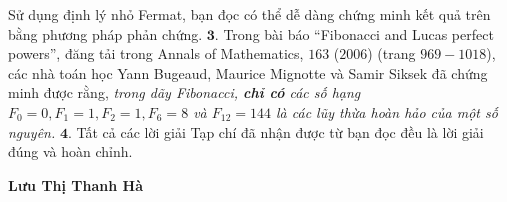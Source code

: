 \begin{multicols}{2}
	\vskip 0.05cm
	Sử dụng định lý nhỏ Fermat, bạn đọc có thể dễ dàng chứng minh kết quả trên bằng phương pháp phản chứng.
	\vskip 0.05cm
	$\pmb{3.}$ Trong bài báo “Fibonacci and Lucas perfect powers”, đăng tải trong Annals of Mathematics, $163$ ($2006$) (trang $969 - 1018$), các nhà toán học Yann Bugeaud, Maurice Mignotte và Samir Siksek đã chứng minh được rằng, \textit{trong dãy Fibonacci, \textbf{\color{thachthuctoanhoc}chỉ có} các số hạng $F_0=0, F_1 = 1, F_2 = 1, F_6 = 8$ và $F_{12} = 144$ là các lũy thừa hoàn hảo của một số nguyên.}
	\vskip 0.05cm
	$\pmb{4.}$ Tất cả các lời giải Tạp chí đã nhận được từ bạn đọc đều là lời giải đúng và hoàn chỉnh.
	\begin{flushright}
		\textbf{\color{thachthuctoanhoc}Lưu Thị Thanh Hà}
	\end{flushright}
\end{multicols}

